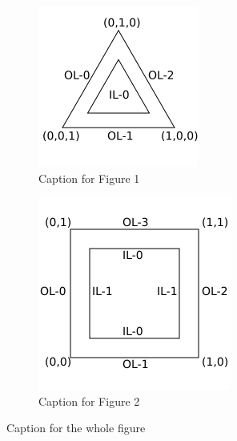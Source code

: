 \documentclass{article}
\begin{document}
\begin{figure}[H]
	\centering
	\begin{subfigure}[h]{0.45\textwidth}
		\includegraphics[width=\textwidth]{img/triangle-patch.png}
		\caption{Caption for Figure 1}
		\label{fig:figure1}
	\end{subfigure}
	\hfill
	\begin{subfigure}[h]{0.45\textwidth}
		\includegraphics[width=\textwidth]{img/quad-patch.png}
		\caption{Caption for Figure 2}
		\label{fig:figure2}
	\end{subfigure}
	\caption{Caption for the whole figure}
	\label{fig:both_figures}
\end{figure}
\end{document}
